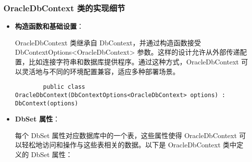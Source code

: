 \subsubsection{OracleDbContext 类的实现细节}

\begin{itemize}
	\item \textbf{构造函数和基础设置}：
	
	OracleDbContext 类继承自 DbContext，并通过构造函数接受 DbContextOptions<OracleDbContext> 参数。这样的设计允许从外部传递配置，比如连接字符串和数据库提供程序。通过这种方式，OracleDbContext 可以灵活地与不同的环境配置兼容，适应多种部署场景。
	
	\begin{verbatim}
		public class OracleDbContext(DbContextOptions<OracleDbContext> options) : DbContext(options)
	\end{verbatim}
	
	\item \textbf{DbSet 属性}：
	
	每个 DbSet 属性对应数据库中的一个表，这些属性使得 OracleDbContext 可以轻松地访问和操作与这些表相关的数据。以下是 OracleDbContext 类中定义的 DbSet 属性：
	

\end{itemize}
